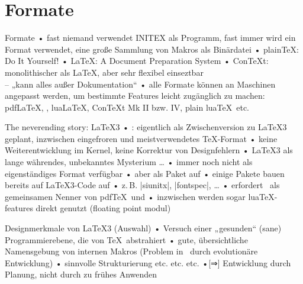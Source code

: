 \documentclass[t]{beamer}
\begin{document}
\section{Formate}
\begin{frame}{Formate}
• fast niemand verwendet INITEX als Programm, fast immer wird ein Format verwendet, eine große Sammlung von Makros als Binärdatei
• plain\TeX: Do It Yourself!
• \LaTeX: A Document Preparation System
• Con\TeX t: monolithischer als \LaTeX, aber sehr flexibel einseztbar\\%
\pause – „kann alles außer Dokumentation“ \pause
• alle Formate können an Maschinen angepasst werden, um bestimmte Features leicht zugänglich zu machen: pdf\LaTeX, \XeLaTeX, lua\LaTeX, Con\TeX t Mk II bzw. IV, plain lua\TeX\ etc.
\•
\end{frame}

\begin{frame}{The neverending story: \LaTeX3}   %
• \LaTeXe: eigentlich als Zwischenversion zu \LaTeX3 geplant, inzwischen eingefroren und meistverwendetes \TeX-Format
• keine Weiterentwicklung im Kernel, keine Korrektur von Designfehlern
• \LaTeX3 als lange währendes, unbekanntes Mysterium …
• immer noch nicht als eigenständiges Format verfügbar\pause
• aber als Paket auf \LaTeXe
• einige Pakete bauen bereits auf \LaTeX3-Code auf
• z.\,B. |siunitx|, |fontspec|, …
• erfordert \eTeX\ als gemeinsamen Nenner von pdf\TeX\ und \XeTeX
• inzwischen werden sogar lua\TeX-features direkt genutzt (floating point modul)
\•
\end{frame}

\begin{frame}{Designmerkmale von \LaTeX3 (Auswahl)}
• Versuch einer „gesunden“ (sane) Programmierebene, die von \TeX\ abstrahiert
• gute, übersichtliche Namensgebung von internen Makros (Problem in \LaTeXe\ durch evolutionäre Entwicklung)
• sinnvolle Strukturierung etc. etc. etc.
•[⇒] Entwicklung durch Planung, nicht durch zu frühes Anwenden
\•
\end{frame}

\end{document}
